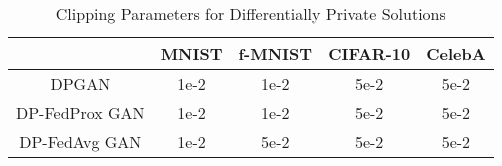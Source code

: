 \documentclass[conference]{IEEEtran}
\begin{document}
\begin{table}[]
\centering
\begin{tabular}{|c|c|c|c|c|}
\hline
               & MNIST & f-MNIST & CIFAR-10 & CelebA \\ \hline
DPGAN          & 1e-2  & 1e-2    & 5e-2     & 5e-2   \\ \hline
DP-FedProx GAN & 1e-2  & 1e-2    & 5e-2     & 5e-2   \\ \hline
DP-FedAvg GAN  & 1e-2  & 5e-2    & 5e-2     & 5e-2   \\ \hline
\end{tabular}
\caption{Clipping Parameters for Differentially Private Solutions}
\label{Tab:clipping_para}
\end{table}








\end{document}
